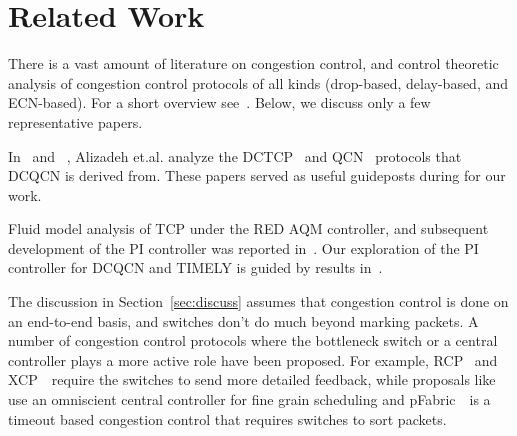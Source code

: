 \section{Related Work}
\label{sec:related}

There is a vast amount of literature on congestion control, and control
theoretic analysis of congestion control protocols of all kinds (drop-based,
delay-based, and ECN-based). For a short overview see~\cite{srikantbook}. Below,
we discuss only a few representative papers.

In~\cite{dctcp-analysis} and ~\cite{qcn-analysis}, Alizadeh et.al. analyze the
DCTCP~\cite{dctcp} and QCN~\cite{qcn} protocols that DCQCN is derived from. These papers served as useful guideposts during for our work.

Fluid model analysis of TCP under the RED AQM controller, and subsequent
development of the PI controller was reported
in~\cite{misra2000fluid,hollot2001designing}. Our exploration of the PI
controller for DCQCN and TIMELY is guided by results
in~\cite{hollot2001designing}.

The discussion in Section~\ref{sec:discuss} assumes that congestion control is
done on an end-to-end basis, and switches don't do much beyond marking packets.
A number of congestion control protocols where the bottleneck switch or a
central controller plays a more active role have been proposed. For example,
RCP~\cite{dukkipati2006rcp} and XCP~\cite{katabi2002congestion}~require the switches to send more detailed
feedback, while proposals like~\cite{vattikonda2012practical,wilson2011better}
use an omniscient central controller for fine grain scheduling and pFabric~\cite{pfabric}~is a timeout based congestion control that requires switches to sort packets. 



